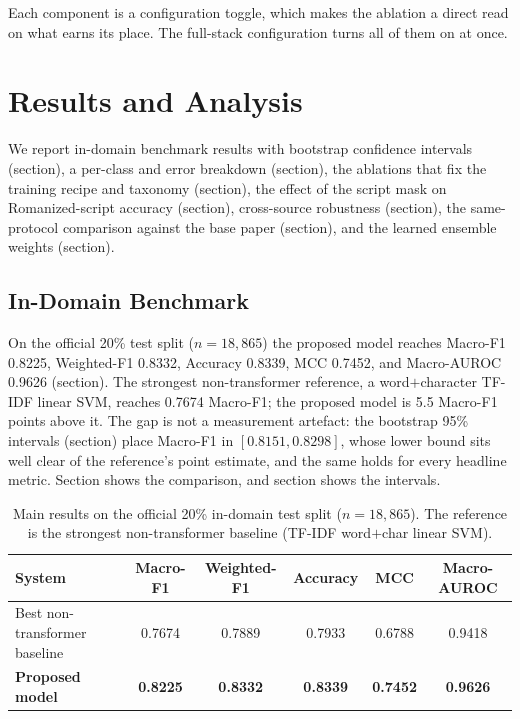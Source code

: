 \documentclass[11pt,a4paper]{article}
\def\Cref#1{Section}%
\def\cref#1{section}%
\begin{document}
Each component is a configuration toggle, which makes the ablation a direct read on what earns its place. The full-stack configuration turns all of them on at once.


\section{Results and Analysis}
\label{sec:results}

We report in-domain benchmark results with bootstrap confidence intervals (\cref{sec:main-results}), a per-class and error breakdown (\cref{sec:perclass-results}), the ablations that fix the training recipe and taxonomy (\cref{sec:ablation-results}), the effect of the script mask on Romanized-script accuracy (\cref{sec:scriptmask-results}), cross-source robustness (\cref{sec:robustness-results}), the same-protocol comparison against the base paper (\cref{sec:basepaper-results}), and the learned ensemble weights (\cref{sec:ensemble-results}).

\subsection{In-Domain Benchmark}
\label{sec:main-results}

On the official 20\% test split ($n = 18{,}865$) the proposed model reaches Macro-F1 0.8225, Weighted-F1 0.8332, Accuracy 0.8339, MCC 0.7452, and Macro-AUROC 0.9626 (\cref{tab:main}). The strongest non-transformer reference, a word$+$character TF-IDF linear SVM, reaches 0.7674 Macro-F1; the proposed model is 5.5 Macro-F1 points above it. The gap is not a measurement artefact: the bootstrap 95\% intervals (\cref{tab:ci}) place Macro-F1 in $[0.8151, 0.8298]$, whose lower bound sits well clear of the reference's point estimate, and the same holds for every headline metric. \Cref{fig:main} shows the comparison, and \cref{fig:ci} shows the intervals.

\begin{table}[!htbp]
\centering
\caption{Main results on the official 20\% in-domain test split ($n = 18{,}865$). The reference is the strongest non-transformer baseline (TF-IDF word$+$char linear SVM).}
\label{tab:main}
\small
\begin{tabular}{@{}lccccc@{}}
\toprule
\textbf{System} & \textbf{Macro-F1} & \textbf{Weighted-F1} & \textbf{Accuracy} & \textbf{MCC} & \textbf{Macro-AUROC} \\
\midrule
Best non-transformer baseline & 0.7674 & 0.7889 & 0.7933 & 0.6788 & 0.9418 \\
\textbf{Proposed model} & \textbf{0.8225} & \textbf{0.8332} & \textbf{0.8339} & \textbf{0.7452} & \textbf{0.9626} \\
\bottomrule
\end{tabular}
\end{table}
\end{document}
